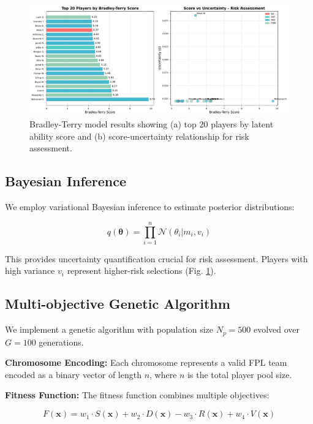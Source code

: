 \documentclass[10pt,a4paper,twocolumn]{article}
\begin{document}
\begin{figure}[h]
\centering
\includegraphics[width=\columnwidth]{figures/bradley_terry_analysis.pdf}
\caption{Bradley-Terry model results showing (a) top 20 players by latent ability score and (b) score-uncertainty relationship for risk assessment.}
\label{fig:bradley_terry}
\end{figure}

\subsection*{Bayesian Inference}

We employ variational Bayesian inference to estimate posterior distributions:

\begin{equation}
q(\boldsymbol{\theta}) = \prod_{i=1}^{n} \mathcal{N}(\theta_i | m_i, v_i)
\end{equation}

This provides uncertainty quantification crucial for risk assessment. Players with high variance $v_i$ represent higher-risk selections (Fig. \ref{fig:bradley_terry}).

\subsection*{Multi-objective Genetic Algorithm}

We implement a genetic algorithm with population size $N_p = 500$ evolved over $G = 100$ generations.

\textbf{Chromosome Encoding:}
Each chromosome represents a valid FPL team encoded as a binary vector of length $n$, where $n$ is the total player pool size.

\textbf{Fitness Function:}
The fitness function combines multiple objectives:

\begin{equation}
F(\mathbf{x}) = w_1 \cdot S(\mathbf{x}) + w_2 \cdot D(\mathbf{x}) - w_3 \cdot R(\mathbf{x}) + w_4 \cdot V(\mathbf{x})
\end{equation}
\end{document}
